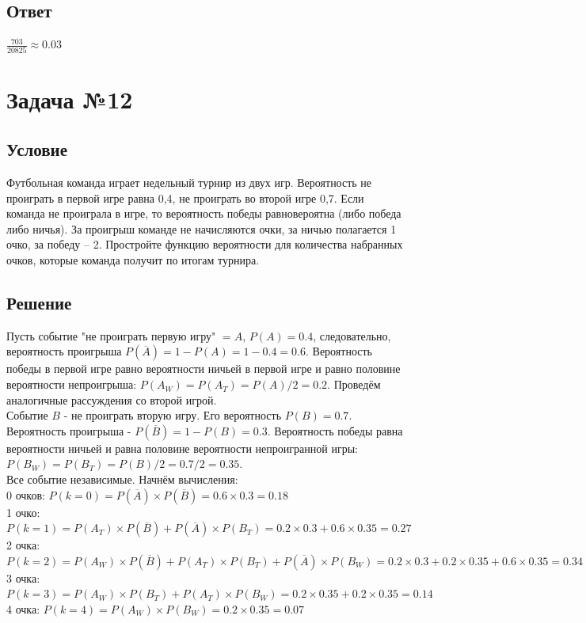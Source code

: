 \documentclass{article}
\begin{document}
\subsection*{Ответ}
$\frac{703}{20825} \approx 0.03$
\section*{Задача №12}
\subsection*{Условие}
Футбольная команда играет недельный турнир из двух игр. Вероятность не
проиграть в первой игре равна 0,4, не проиграть во второй игре 0,7. Если команда не
проиграла в игре, то вероятность победы равновероятна (либо победа либо ничья). За
проигрыш команде не начисляются очки, за ничью полагается 1 очко, за победу – 2.
Простройте функцию вероятности для количества набранных очков, которые команда
получит по итогам турнира. 
\subsection*{Решение}
Пусть событие "не проиграть первую игру"  $=A$, $P(A) = 0.4$, следовательно, вероятность проигрыша $P(\overline{A}) = 1 - P(A) = 1 - 0.4 = 0.6$. Вероятность победы в первой игре равно вероятности ничьей в первой игре и равно половине вероятности непроигрыша: $P(A_W) = P(A_T) = P(A) / 2 = 0.2$.
Проведём аналогичные рассуждения со второй игрой.\\
Событие $B$ - не проиграть вторую игру. Его вероятность $P(B) = 0.7$. Вероятность проигрыша - $P(\overline{B}) = 1 - P(B) = 0.3$. Вероятность победы равна вероятности ничьей и равна половине вероятности непроигранной игры: $P(B_W) = P(B_T) = P(B)/2 = 0.7/2 = 0.35$.\\
Все событие независимые.
Начнём вычисления:\\
0 очков: $P(k=0)=P(\overline{A}) \times P(\overline{B}) = 0.6 \times 0.3 = 0.18$\\
1 очко: $P(k=1) = P(A_T)\times P(\overline{B}) + P(\overline{A})\times P(B_T) = 0.2\times 0.3 + 0.6\times 0.35 = 0.27$\\
2 очка: $P(k=2)=P(A_W)\times P(\overline{B}) + P(A_T) \times P(B_T) + P(\overline{A})\times P(B_W) = 0.2\times 0.3 + 0.2\times 0.35 + 0.6\times 0.35 = 0.34$\\
3 очка: $P(k=3) = P(A_W)\times P(B_T) + P(A_T) \times P(B_W) = 0.2\times 0.35 + 0.2\times 0.35 = 0.14$\\
4 очка: $P(k=4) = P(A_W)\times P(B_W) = 0.2 \times 0.35 = 0.07$
\end{document}
